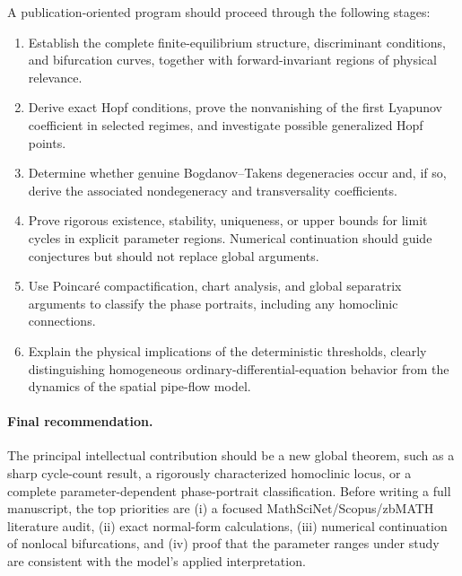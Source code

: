 \documentclass[11pt,a4paper]{article}
\begin{document}
A publication-oriented program should proceed through the following stages:
\begin{enumerate}
\item Establish the complete finite-equilibrium structure, discriminant conditions, and bifurcation curves, together with forward-invariant regions of physical relevance.
\item Derive exact Hopf conditions, prove the nonvanishing of the first Lyapunov coefficient in selected regimes, and investigate possible generalized Hopf points.
\item Determine whether genuine Bogdanov--Takens degeneracies occur and, if so, derive the associated nondegeneracy and transversality coefficients.
\item Prove rigorous existence, stability, uniqueness, or upper bounds for limit cycles in explicit parameter regions. Numerical continuation should guide conjectures but should not replace global arguments.
\item Use Poincar\'e compactification, chart analysis, and global separatrix arguments to classify the phase portraits, including any homoclinic connections.
\item Explain the physical implications of the deterministic thresholds, clearly distinguishing homogeneous ordinary-differential-equation behavior from the dynamics of the spatial pipe-flow model.
\end{enumerate}

\paragraph{Final recommendation.}
The principal intellectual contribution should be a new global theorem, such as a sharp cycle-count result, a rigorously characterized homoclinic locus, or a complete parameter-dependent phase-portrait classification. Before writing a full manuscript, the top priorities are (i) a focused MathSciNet/Scopus/zbMATH literature audit, (ii) exact normal-form calculations, (iii) numerical continuation of nonlocal bifurcations, and (iv) proof that the parameter ranges under study are consistent with the model's applied interpretation.
\end{document}
